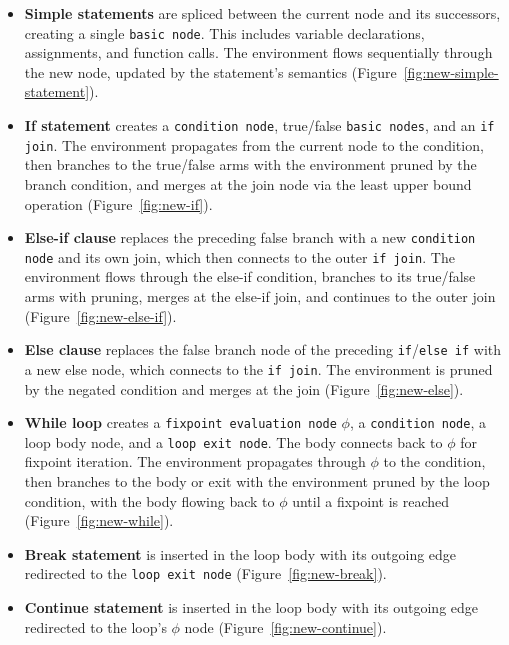 \documentclass[pdflatex,sn-basic]{sn-jnl}%
\theoremstyle{thmstyleone}%
\theoremstyle{thmstyletwo}%
\theoremstyle{thmstylethree}%
\begin{document}
\begin{itemize}
  \item \textbf{Simple statements} are spliced between the current node and its successors, creating a single \texttt{basic node}.
        This includes variable declarations, assignments, and function calls.
        The environment flows sequentially through the new node, updated by the statement's semantics (Figure~\ref{fig:new-simple-statement}).

  \item \textbf{If statement} creates a \texttt{condition node}, true/false \texttt{basic nodes}, and an \texttt{if join}.
        The environment propagates from the current node to the condition, then branches to the true/false arms with the environment pruned by the branch condition,
        and merges at the join node via the least upper bound operation (Figure~\ref{fig:new-if}).

  \item \textbf{Else-if clause} replaces the preceding false branch with a new \texttt{condition node} and its own join, which then connects to the outer \texttt{if join}.
        The environment flows through the else-if condition, branches to its true/false arms with pruning, merges at the else-if join,
        and continues to the outer join (Figure~\ref{fig:new-else-if}).

  \item \textbf{Else clause} replaces the false branch node of the preceding \texttt{if}/\texttt{else if} with a new else node, which connects to the \texttt{if join}.
        The environment is pruned by the negated condition and merges at the join (Figure~\ref{fig:new-else}).

  \item \textbf{While loop} creates a \texttt{fixpoint evaluation node} $\phi$, a \texttt{condition node}, a loop body node, and a \texttt{loop exit node}.
        The body connects back to $\phi$ for fixpoint iteration.
        The environment propagates through $\phi$ to the condition, then branches to the body or exit with the environment pruned by the loop condition,
        with the body flowing back to $\phi$ until a fixpoint is reached (Figure~\ref{fig:new-while}).

  \item \textbf{Break statement} is inserted in the loop body with its outgoing edge redirected to the \texttt{loop exit node} (Figure~\ref{fig:new-break}).

  \item \textbf{Continue statement} is inserted in the loop body with its outgoing edge redirected to the loop's $\phi$ node (Figure~\ref{fig:new-continue}).


\end{itemize}
\end{document}
